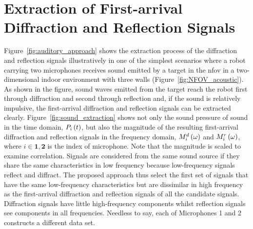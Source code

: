 \documentclass[letterpaper, 10 pt, conference]{ieeeconf}  %
\begin{document}
\section{Extraction of First-arrival Diffraction and Reflection Signals} 
Figure~\ref{fig:auditory_approach} shows the extraction process of the diffraction and reflection signals illustratively in one of the simplest scenarios where a robot carrying two microphones receives sound emitted by a target in the \gls{nfov} in a two-dimensional indoor environment with three walls (Figure~\ref{fig:NFOV_acoustic}). As shown in the figure, sound waves emitted from the target reach the robot first through diffraction and second through reflection and, if the sound is relatively impulsive, the first-arrival diffraction and reflection signals can be extracted clearly.   Figure~\ref{fig:sound_extraction} shows not only the sound pressure of sound in the time domain, $P_i\left ( t \right )$, but also the magnitude of the resulting first-arrival diffraction and reflection signals in the frequency domain, $M_i^d\left ( \omega \right )$ and $M_i^r\left ( \omega \right )$, where $i \in \bm{1,2}$ is the index of microphone.  Note that the magnitude is scaled to examine correlation.  Signals are considered from the same sound source if they share the same characteristics in low frequency because low-frequency signals reflect and diffract.  The proposed approach thus select the first set of signals that have the same low-frequency characteristics but are dissimilar in high frequency as the first-arrival diffraction and reflection signals of all the candidate signals.  Diffraction signals have little high-frequency components whilst reflection signals see components in all frequencies.  Needless to say, each of Microphones 1 and 2 constructs a different data set.  
\end{document}
